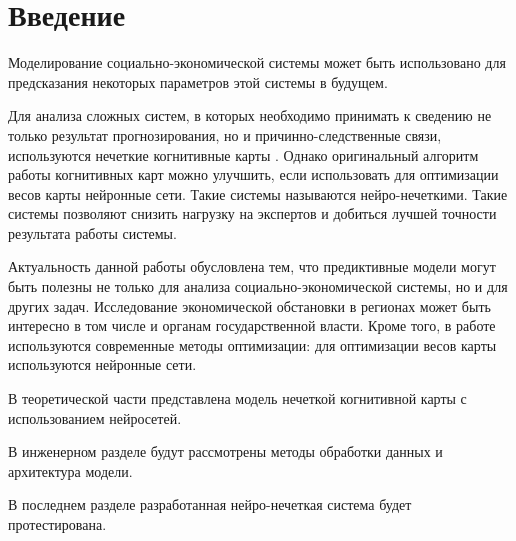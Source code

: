 \chapter*{Введение}
\label{sec:afterwords}

Моделирование социально-экономической системы может быть использовано для предсказания
некоторых параметров этой системы в будущем.

Для анализа сложных систем, в которых необходимо принимать к сведению не только результат прогнозирования, но и причинно-следственные связи, используются нечеткие когнитивные карты \cite{osoba2019dags} \cite{kosko1986fuzzy}. Однако оригинальный алгоритм работы когнитивных карт можно улучшить, если использовать для оптимизации весов карты нейронные сети. Такие системы называются нейро-нечеткими. Такие системы позволяют снизить нагрузку на экспертов и добиться лучшей точности результата работы системы.

Актуальность данной работы обусловлена тем, что предиктивные модели
могут быть полезны не только для анализа социально-экономической системы, но и для других задач.
Исследование экономической обстановки в регионах может быть интересно в том числе и органам государственной власти.
Кроме того, в работе используются современные методы оптимизации: для оптимизации весов карты используются нейронные сети.

В теоретической части представлена модель нечеткой когнитивной карты с использованием
нейросетей.

В инженерном разделе будут рассмотрены методы обработки данных и архитектура модели.

В последнем разделе разработанная нейро-нечеткая система будет протестирована.